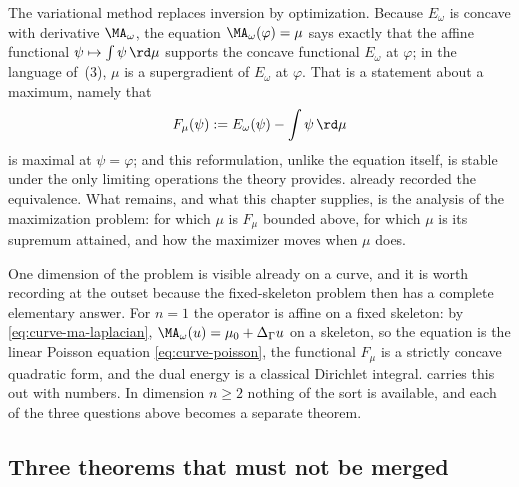 The variational method replaces inversion by optimization.  Because
$E_\omega$ is concave with derivative $\MA_\omega$, the equation
$\MA_\omega(\varphi)=\mu$ says exactly that the affine functional
$\psi\mapsto\int\psi\,\rd\mu$ supports the concave functional
$E_\omega$ at $\varphi$; in the language of
\,(3), $\mu$ is a supergradient of
$E_\omega$ at $\varphi$.  That is a statement about a maximum, namely
that
\[
 F_\mu(\psi):=E_\omega(\psi)-\int\psi\,\rd\mu
\]
is maximal at $\psi=\varphi$; and this reformulation, unlike the equation
itself, is stable under the only limiting operations the theory provides.
 already recorded the
equivalence.  What remains, and what this chapter supplies, is the analysis
of the maximization problem: for which $\mu$ is $F_\mu$ bounded above,
for which $\mu$ is its supremum attained, and how the maximizer moves when
$\mu$ does.

One dimension of the problem is visible already on a curve, and it is worth
recording at the outset because the fixed-skeleton problem then has a
complete elementary answer.  For $n=1$ the operator is affine on a fixed
skeleton: by \eqref{eq:curve-ma-laplacian},
$\MA_\omega(u)=\mu_0+\Delta_\Gamma u$ on a skeleton, so the equation is
the linear Poisson equation \eqref{eq:curve-poisson}, the functional
$F_\mu$ is a strictly concave quadratic form, and the dual energy is a
classical Dirichlet integral.   carries this out with
numbers.  In dimension $n\geq2$ nothing of the sort is available, and each
of the three questions above becomes a separate theorem.

\subsection{Three theorems that must not be merged}
\label{sec:ch28-three}

